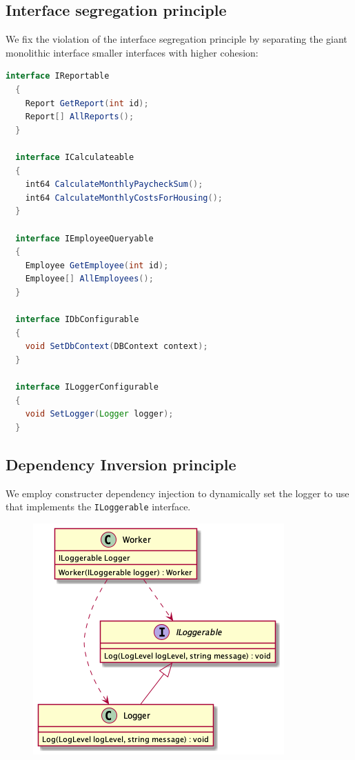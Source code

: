 \documentclass[12pt,letterpaper]{article}
\begin{document}
\pagebreak
\subsection*{Interface segregation principle}

We fix the violation of the interface segregation principle by separating the giant monolithic interface smaller interfaces with higher cohesion:

\begin{lstlisting}[language=Java]
  interface IReportable
  {
    Report GetReport(int id);
    Report[] AllReports();
  }

  interface ICalculateable
  {
    int64 CalculateMonthlyPaycheckSum();
    int64 CalculateMonthlyCostsForHousing();
  }

  interface IEmployeeQueryable
  {
    Employee GetEmployee(int id);
    Employee[] AllEmployees();
  }

  interface IDbConfigurable
  {
    void SetDbContext(DBContext context);
  }

  interface ILoggerConfigurable
  {
    void SetLogger(Logger logger);
  }
\end{lstlisting}

\pagebreak
\subsection*{Dependency Inversion principle}

We employ constructer dependency injection to dynamically set the logger to use that implements the \texttt{ILoggerable} interface.

\begin{figure}[h]
  \centering
  \includegraphics[scale=0.65]{../out/Documents/plantuml/exercise5_dependency_inversion/exercise5_dependency_inversion.png}
\end{figure}
\end{document}
